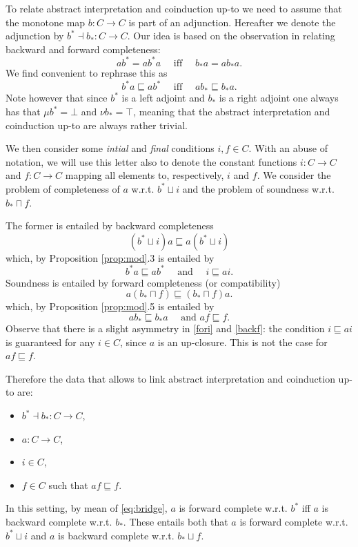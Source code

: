 \documentclass{llncs}
\begin{document}
To relate abstract interpretation and coinduction up-to we need to assume that the monotone map $b\colon C\to C$ is part of an adjunction.
Hereafter we denote the adjunction by $b^*\dashv b_* \colon C\to C$. Our idea is based on the observation in \cite{} relating backward and forward completeness:
$$ ab^* = ab^*a \quad \text{ iff } \quad b_*a = ab_* a \text{.}$$
We find convenient to rephrase this as
\begin{equation}\label{eq:bridge}
b^*a \sqsubseteq ab^*\quad \text{ iff } \quad ab_* \sqsubseteq b_*a \text{.}
\end{equation}
Note however that since $b^*$ is a left adjoint and $b_*$ is a right adjoint one always has that $\mu b^* = \bot$ and $\nu b_* = \top$, meaning that the abstract interpretation and coinduction up-to are always rather trivial.


We then consider some \emph{intial} and \emph{final} conditions $i,f\in C$. With an abuse of notation, we will use this letter also to denote the constant functions $i\colon C\to C$ and $f\colon C\to C$ mapping all elements to, respectively, $i$ and $f$.
We consider the problem of completeness of $a$ w.r.t. $b^*\sqcup i$ and the problem of soundness w.r.t. $b_*\sqcap f$.

The former is entailed by backward completeness
$$(b^* \sqcup i) a \sqsubseteq a (b^* \sqcup i)$$
which, by Proposition \ref{prop:mod}.3 is entailed by 
\begin{equation}\label{fori}
b^*a \sqsubseteq a b^*  \quad \text{ and } \quad i \sqsubseteq ai \text{.}\end{equation}
Soundness is entailed by forward completeness (or compatibility)
$$
a(b_*\sqcap f) \sqsubseteq (b_* \sqcap f) a \text{.}
$$
which, by Proposition \ref{prop:mod}.5 is entailed by 
\begin{equation}\label{backf}
ab_* \sqsubseteq b_*  a \quad \text{ and } af \sqsubseteq f \text{.}
\end{equation}
Observe that there is a slight asymmetry in \eqref{fori} and \eqref{backf}: the condition $i \sqsubseteq ai $ is guaranteed for any $i\in C$, since $a$ is an up-closure. This is not the case for $af \sqsubseteq f $.

Therefore the data that allows to link abstract interpretation and coinduction up-to are:
\begin{itemize}
\item $b^*\dashv b_* \colon C\to C$,
\item $a\colon C \to C$,
\item $i\in C$,
\item $f\in C$ such that $af \sqsubseteq f$.
\end{itemize}
In this setting, by mean of \eqref{eq:bridge}, $a$ is forward complete w.r.t. $b^*$ iff  $a$ is backward complete w.r.t. $b_*$. These entails both that 
$a$ is forward complete w.r.t. $b^*\sqcup i $ and $a$ is backward complete w.r.t. $b_* \sqcup f$.
\end{document}

